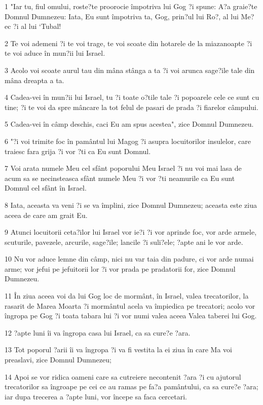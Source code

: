 \par 1 "Iar tu, fiul omului, roste?te proorocie împotriva lui Gog ?i spune: A?a graie?te Domnul Dumnezeu: Iata, Eu sunt împotriva ta, Gog, prin?ul lui Ro?, al lui Me?ec ?i al lui `Tubal!
\par 2 Te voi ademeni ?i te voi trage, te voi scoate din hotarele de la miazanoapte ?i te voi aduce în mun?ii lui Israel.
\par 3 Acolo voi scoate aurul tau din mâna stânga a ta ?i voi arunca sage?ile tale din mâna dreapta a ta.
\par 4 Cadea-vei în mun?ii lui Israel, tu ?i toate o?tile tale ?i popoarele cele ce sunt cu tine; ?i te voi da spre mâncare la tot felul de pasari de prada ?i fiarelor câmpului.
\par 5 Cadea-vei în câmp deschis, caci Eu am spus acestea", zice Domnul Dumnezeu.
\par 6 "?i voi trimite foc în pamântul lui Magog ?i asupra locuitorilor insulelor, care traiesc fara grija ?i vor ?ti ca Eu sunt Domnul.
\par 7 Voi arata numele Meu cel sfânt poporului Meu Israel ?i nu voi mai lasa de acum sa se necinsteasca sfânt numele Meu ?i vor ?ti neamurile ca Eu sunt Domnul cel sfânt în Israel.
\par 8 Iata, aceasta va veni ?i se va împlini, zice Domnul Dumnezeu; aceasta este ziua aceea de care am grait Eu.
\par 9 Atunci locuitorii ceta?ilor lui Israel vor ie?i ?i vor aprinde foc, vor arde armele, scuturile, pavezele, arcurile, sage?ile; lancile ?i suli?ele; ?apte ani le vor arde.
\par 10 Nu vor aduce lemne din câmp, nici nu var taia din padure, ci vor arde numai arme; vor jefui pe jefuitorii lor ?i vor prada pe pradatorii for, zice Domnul Dumnezeu.
\par 11 În ziua aceea voi da lui Gog loc de mormânt, în Israel, valea trecatorilor, la rasarit de Marea Moarta ?i mormântul acela va împiedica pe trecatori; acolo vor îngropa pe Gog ?i toata tabara lui ?i vor numi valea aceea Valea taberei lui Gog.
\par 12 ?apte luni îi va îngropa casa lui Israel, ca sa cure?e ?ara.
\par 13 Tot poporul ?arii îi va îngropa ?i va fi vestita la ei ziua în care Ma voi preaslavi, zice Domnul Dumnezeu;
\par 14 Apoi se vor ridica oameni care sa cutreiere necontenit ?ara ?i cu ajutorul trecatorilor sa îngroape pe cei ce au ramas pe fa?a pamântului, ca sa cure?e ?ara; iar dupa trecerea a ?apte luni, vor începe sa faca cercetari.
